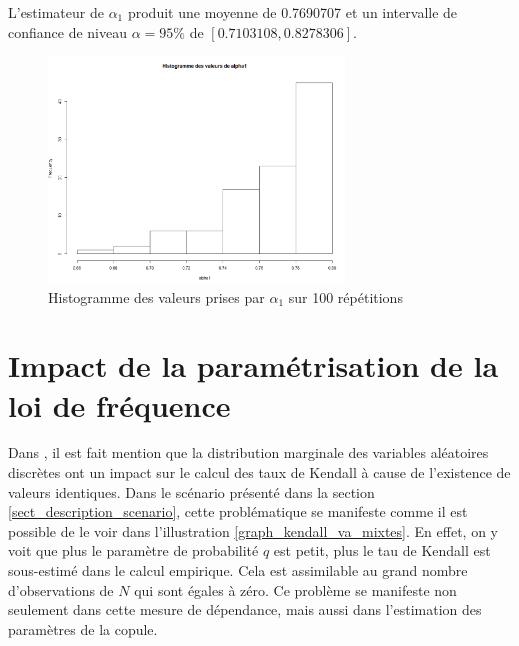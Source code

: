 \documentclass[11pt]{article}
\begin{document}
	L'estimateur de $\alpha_{1}$ produit une moyenne de  0.7690707 et un intervalle de confiance de niveau $\alpha = 95\%$ de $[0.7103108,0.8278306]$.

	\begin{figure}[H]
		\centering
		\includegraphics[height=6cm]{graph/alpha12.png}
		\caption[Paramètre $\alpha_{1}$]{Histogramme des valeurs prises par $\alpha_{1}$ sur 100 répétitions} 
		\label{alpha12}
	\end{figure}


\section{Impact de la paramétrisation de la loi de fréquence}
	
	Dans \cite{nikoloulopoulos2009modeling}, il est fait mention que la distribution marginale des variables aléatoires discrètes ont un impact sur le calcul des taux de Kendall à cause de l'existence de valeurs identiques. Dans le scénario présenté dans la section \ref{sect_description_scenario}, cette problématique se manifeste comme il est possible de le voir dans l'illustration \ref{graph_kendall_va_mixtes}. En effet, on y voit que plus le paramètre de probabilité $q$ est petit, plus le tau de Kendall est sous-estimé dans le calcul empirique. Cela est assimilable au grand nombre d'observations de $N$ qui sont égales à zéro. Ce problème se manifeste non seulement dans cette mesure de dépendance, mais aussi dans l'estimation des paramètres de la copule.
	
\end{document}
